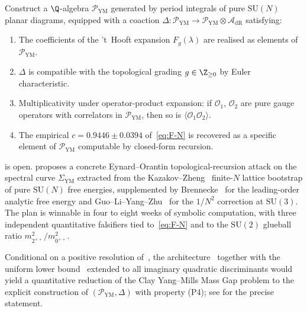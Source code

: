 \begin{problem}\label{prob:YM-periods}
Construct a $\Q$-algebra $\mathcal{P}_{\mathrm{YM}}$ generated by
period integrals of pure $\mathrm{SU}(N)$ planar diagrams,
equipped with a coaction
$\Delta : \mathcal{P}_{\mathrm{YM}} \to \mathcal{P}_{\mathrm{YM}}
\otimes \mathcal{A}_{\mathrm{dR}}$ satisfying:
\begin{enumerate}
\item[\textup{(P1)}] The coefficients of the 't~Hooft expansion
$F_g(\lambda)$ are realised as elements of
$\mathcal{P}_{\mathrm{YM}}$.
\item[\textup{(P2)}] $\Delta$ is compatible with the topological
grading $g \in \Z_{\geq 0}$ by Euler characteristic.
\item[\textup{(P3)}] Multiplicativity under operator-product
expansion: if $\mathcal{O}_1$, $\mathcal{O}_2$ are pure gauge
operators with correlators in $\mathcal{P}_{\mathrm{YM}}$, then so
is $\langle \mathcal{O}_1 \mathcal{O}_2 \rangle$.
\item[\textup{(P4)}] The empirical $c = 0.9446 \pm 0.0394$
of~\eqref{eq:F-N} is recovered as a specific element of
$\mathcal{P}_{\mathrm{YM}}$ computable by closed-form recursion.
\end{enumerate}
\end{problem}

 is open.  proposes a
concrete Eynard--Orantin topological-recursion attack on the
spectral curve $\Sigma_{\mathrm{YM}}$ extracted from the
Kazakov--Zheng~\cite{KazakovZheng2024} finite-$N$ lattice
bootstrap of pure $\mathrm{SU}(N)$ free energies, supplemented by
Brennecke~\cite{Brennecke2025} for the leading-order analytic
free energy and Guo--Li--Yang--Zhu~\cite{GuoLiYangZhu2025} for the
$1/N^2$ correction at $\mathrm{SU}(3)$. The plan is winnable in
four to eight weeks of symbolic computation, with three
independent quantitative falsifiers tied to~\eqref{eq:F-N} and
to the $\mathrm{SU}(2)$ glueball ratio
$m_{2^{++}}^2 / m_{0^{++}}^2$.

Conditional on a positive resolution of~,
the architecture~ together with the uniform lower
bound~ extended to all imaginary quadratic
discriminants would yield a quantitative reduction of the Clay
Yang--Mills Mass Gap problem to the explicit construction
of $(\mathcal{P}_{\mathrm{YM}}, \Delta)$ with property (P4); see
 for the precise statement.

